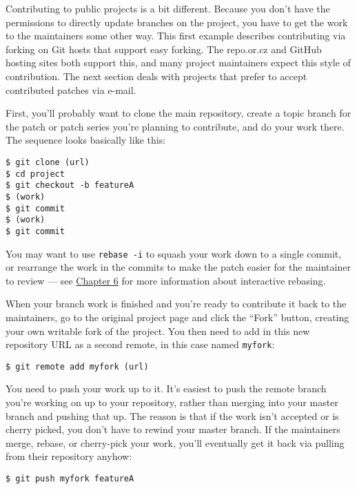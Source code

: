 \documentclass[a4paper]{book}
\newcounter{tab}[chapter]
\newcommand{\prechap}{Chapter }
\newcommand{\postchap}{}
\newcommand{\chapref}[1]{\hyperref[chap:#1]{\prechap #1\postchap}}
\begin{document}
Contributing to public projects is a bit different. Because you don't have the permissions to directly update branches on the project, you have to get the work to the maintainers some other way. This first example describes contributing via forking on Git hosts that support easy forking. The repo.or.cz and GitHub hosting sites both support this, and many project maintainers expect this style of contribution. The next section deals with projects that prefer to accept contributed patches via e-mail.

First, you'll probably want to clone the main repository, create a topic branch for the patch or patch series you're planning to contribute, and do your work there. The sequence looks basically like this:

\begin{shaded}\begin{verbatim}
$ git clone (url)
$ cd project
$ git checkout -b featureA
$ (work)
$ git commit
$ (work)
$ git commit
\end{verbatim}\end{shaded}

You may want to use \texttt{rebase -i} to squash your work down to a single commit, or rearrange the work in the commits to make the patch easier for the maintainer to review --- see \chapref{6} for more information about interactive rebasing.

When your branch work is finished and you're ready to contribute it back to the maintainers, go to the original project page and click the “Fork” button, creating your own writable fork of the project. You then need to add in this new repository URL as a second remote, in this case named \texttt{myfork}:

\begin{shaded}\begin{verbatim}
$ git remote add myfork (url)
\end{verbatim}\end{shaded}

You need to push your work up to it. It's easiest to push the remote branch you're working on up to your repository, rather than merging into your master branch and pushing that up. The reason is that if the work isn't accepted or is cherry picked, you don't have to rewind your master branch. If the maintainers merge, rebase, or cherry-pick your work, you'll eventually get it back via pulling from their repository anyhow:

\begin{shaded}\begin{verbatim}
$ git push myfork featureA
\end{verbatim}\end{shaded}
\end{document}
